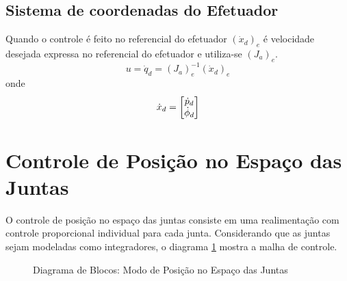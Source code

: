 \subsection{Sistema de coordenadas do Efetuador} \label{sec:openloopefct}
Quando o controle é feito no referencial do efetuador $({\dot{x}}_d)_e$ é velocidade desejada expressa no referencial do efetuador e utiliza-se $({J}_{a})_e$.
\begin{equation}
{u} = {\dot{q}}_d = ({J}_{a})_e^{-1} ({\dot{x}}_d)_e
\end{equation}
onde 
\begin{equation}
{\dot{x}}_d = \begin{bmatrix}{\dot{p}}_d \\ \dot{\phi}_d\end{bmatrix}
\end{equation}

\section{Controle de Posição no Espaço das Juntas} \label{sec:position_joint}
O controle de posição no espaço das juntas consiste em uma realimentação com controle proporcional individual para cada junta. Considerando que as juntas sejam modeladas como integradores, o diagrama \ref{fig:pos_juntas} mostra a malha de controle.

\begin{figure}[h!]
\centering
{}
\caption{Diagrama de Blocos: Modo de Posição no Espaço das Juntas}
\label{fig:pos_juntas}
\end{figure}

